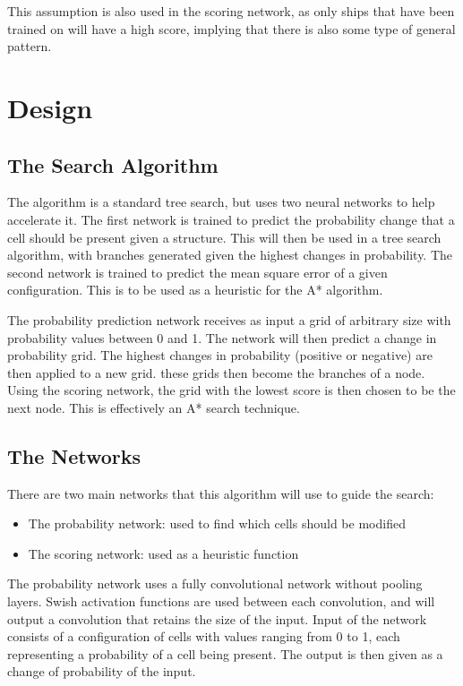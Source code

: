 \documentclass{l4proj}
\begin{document}
This assumption is also used in the scoring network, as only ships that have been trained on will have a high score, implying that there is also some type of general pattern.

\chapter{Design}

\section{The Search Algorithm}

The algorithm is a standard tree search, but uses two neural networks to help accelerate it. The first network is trained to predict the probability change that a cell should be present given a structure. This will then be used in a tree search algorithm, with branches generated given the highest changes in probability. The second network is trained to predict the mean square error of a given configuration. This is to be used as a heuristic for the A* algorithm.

The probability prediction network receives as input a grid of arbitrary size with probability values between 0 and 1. The network will then predict a change in probability grid. The highest changes in probability (positive or negative) are then applied to a new grid. these grids then become the branches of a node. Using the scoring network, the grid with the lowest score is then chosen to be the next node. This is effectively an A* search technique.

\section{The Networks}

There are two main networks that this algorithm will use to guide the search:

\begin{itemize}
    \item The probability network: used to find which cells should be modified
    \item The scoring network: used as a heuristic function
\end{itemize}

The probability network uses a fully convolutional network without pooling layers. Swish activation functions are used between each convolution, and will output a convolution that retains the size of the input. Input of the network consists of a configuration of cells with values ranging from 0 to 1, each representing a probability of a cell being present. The output is then given as a change of probability of the input.
\end{document}
